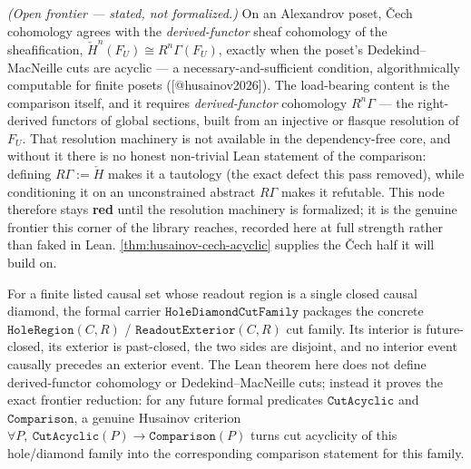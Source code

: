 \begin{theorem}[Husainov: \v{C}ech $=$ derived-functor cohomology]\label{thm:husainov-cech-derived}\notready{}
\emph{(Open frontier --- stated, not formalized.)} On an Alexandrov poset, \v{C}ech cohomology
agrees with the \emph{derived-functor} sheaf cohomology of the sheafification,
$\check{H}^n(F_U) \cong R^n\Gamma(F_U)$, exactly when the poset's Dedekind--MacNeille cuts are
acyclic --- a necessary-and-sufficient condition, algorithmically computable for finite posets
([@husainov2026]). The load-bearing content is the comparison itself, and it requires
\emph{derived-functor} cohomology $R^n\Gamma$ --- the right-derived functors of global sections,
built from an injective or flasque resolution of $F_U$. That resolution machinery is not
available in the dependency-free core, and without it there is no honest non-trivial Lean
statement of the comparison: defining $R\Gamma := \check{H}$ makes it a tautology (the exact
defect this pass removed), while conditioning it on an unconstrained abstract $R\Gamma$ makes it
refutable. This node therefore stays \textbf{red} until the resolution machinery is formalized;
it is the genuine frontier this corner of the library reaches, recorded here at full strength
rather than faked in Lean. \cref{thm:husainov-cech-acyclic} supplies the \v{C}ech half it will
build on.
\end{theorem}

\begin{theorem}\label{thm:hole-diamond-husainov-frontier}\leanok{}
For a finite listed causal set whose readout region is a single closed causal diamond, the
formal carrier $\texttt{HoleDiamondCutFamily}$ packages the concrete
$\texttt{HoleRegion}(C,R)$ / $\texttt{ReadoutExterior}(C,R)$ cut family. Its interior is
future-closed, its exterior is past-closed, the two sides are disjoint, and no interior event
causally precedes an exterior event. The Lean theorem here does not define derived-functor
cohomology or Dedekind--MacNeille cuts; instead it proves the exact frontier reduction:
for any future formal predicates $\texttt{CutAcyclic}$ and $\texttt{Comparison}$, a genuine
Husainov criterion
$\forall P,\ \texttt{CutAcyclic}(P) \to \texttt{Comparison}(P)$ turns cut acyclicity of this
hole/diamond family into the corresponding comparison statement for this family.
\end{theorem}

